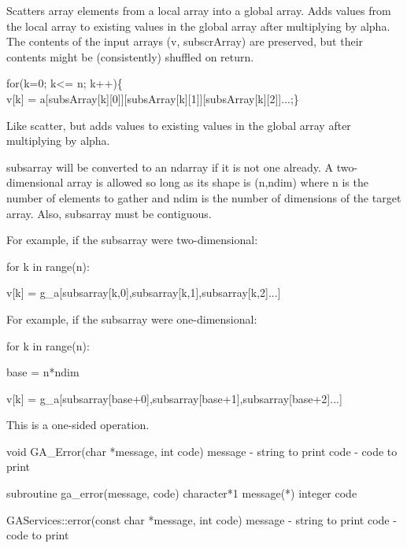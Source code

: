 \documentclass[12pt]{article}
\begin{document}
\begin{desc}

Scatters array elements from a local array into a global array. Adds 
values from the local array to existing values in the global array 
after multiplying by alpha. The contents of the input arrays (v, subscrArray) 
are preserved, but their contents might be (consistently) shuffled on return.
   
for(k=0; k<= n; k++)\{\\v[k] = a[subsArray[k][0]][subsArray[k][1]][subsArray[k][2]]...;\}\   

Like scatter, but adds values to existing values in the global array after 
multiplying by alpha.

subsarray will be converted to an ndarray if it is not one already. A 
two-dimensional array is allowed so long as its shape is (n,ndim) where n is 
the number of elements to gather and ndim is the number of dimensions of the 
target array. Also, subsarray must be contiguous.

For example, if the subsarray were two-dimensional:

for k in range(n):

    v[k] = g_a[subsarray[k,0],subsarray[k,1],subsarray[k,2]...]

For example, if the subsarray were one-dimensional:


for k in range(n):

    base = n*ndim

    v[k] = g_a[subsarray[base+0],subsarray[base+1],subsarray[base+2]...]

This is a one-sided operation.

\end{desc}


\begin{capi}
void GA_Error(char *message, int code)
   message       - string to print                                        \access{[input]} 
   code          - code to print                                          \access{[input]} 
\end{capi}
\begin{fapi}
subroutine ga_error(message, code)
   character*1  message(*)                                                \access{[input]} 
   integer      code                                                      \access{[input]} 
\end{fapi}

\begin{cxxapi}
GAServices::error(const char *message, int code)
   message       - string to print                                        \access{[input]}
   code          - code to print                                          \access{[input]}
\end{cxxapi}
\end{document}
